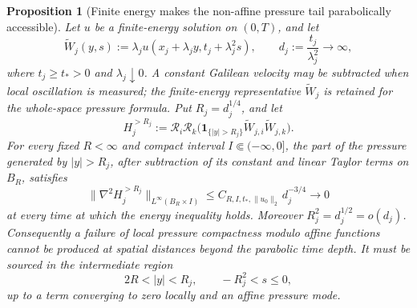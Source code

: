 \documentclass[11pt]{amsart}
\numberwithin{equation}{section}
\theoremstyle{plain}
\newtheorem{proposition}[proposition]{Proposition}
\theoremstyle{definition}
\theoremstyle{remark}
\begin{document}
\begin{proposition}[Finite energy makes the non-affine pressure tail
parabolically accessible]
\label{prop:harmonic-pressure-tail-accessibility}
Let \(u\) be a finite-energy solution on \((0,T)\), and let
\begin{equation}\label{eq:finite-energy-exact-rescalings}
 \widetilde W_j(y,s)
 :=\lambda_j u(x_j+\lambda_jy,t_j+\lambda_j^2s),
 \qquad
 d_j:=\frac{t_j}{\lambda_j^2}\longrightarrow\infty,
\end{equation}
where \(t_j\ge t_*>0\) and \(\lambda_j\downarrow0\).  A constant
Galilean velocity may be subtracted when local oscillation is measured; the
finite-energy representative \(\widetilde W_j\) is retained for the
whole-space pressure formula.  Put \(R_j=d_j^{1/4}\), and let
\[
 H_j^{>R_j}
 :=\mathcal R_i\mathcal R_k
   \bigl(\mathbf 1_{\{|y|>R_j\}}
         \widetilde W_{j,i}\widetilde W_{j,k}\bigr).
\]
For every fixed
\(R<\infty\) and compact interval \(I\Subset(-\infty,0]\), the part of the
pressure generated by \(|y|>R_j\), after subtraction of its constant and
linear Taylor terms on \(B_R\), satisfies
\begin{equation}\label{eq:far-pressure-tail-decay}
 \|\nabla^2 H_j^{>R_j}\|_{L^\infty(B_R\times I)}
 \le C_{R,I,t_*,\|u_0\|_2}\,d_j^{-3/4}\longrightarrow0
\end{equation}
at every time at which the energy inequality holds.  Moreover
\(R_j^2=d_j^{1/2}=o(d_j)\).  Consequently a failure of local pressure
compactness modulo affine functions cannot be produced at spatial distances
beyond the parabolic time depth.  It must be sourced in the intermediate
region
\begin{equation}\label{eq:accessible-pressure-annulus}
 2R<|y|<R_j,
 \qquad -R_j^2<s\le0,
\end{equation}
up to a term converging to zero locally and an affine pressure mode.
\end{proposition}
\end{document}
